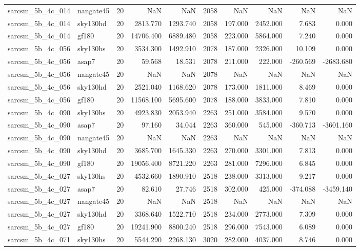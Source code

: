 \begin{longtable}{llrrrrrrrr}
sarcsm\_5b\_4c\_014 & nangate45 & 20 & NaN & NaN & 2058 & NaN & NaN & NaN & NaN \\
sarcsm\_5b\_4c\_014 & sky130hd & 20 & 2813.770 & 1293.740 & 2058 & 197.000 & 2452.000 & 7.683 & 0.000 \\
sarcsm\_5b\_4c\_014 & gf180 & 20 & 14706.400 & 6889.480 & 2058 & 223.000 & 5864.000 & 7.240 & 0.000 \\
sarcsm\_5b\_4c\_056 & sky130hs & 20 & 3534.300 & 1492.910 & 2078 & 187.000 & 2326.000 & 10.109 & 0.000 \\
sarcsm\_5b\_4c\_056 & asap7 & 20 & 59.568 & 18.531 & 2078 & 211.000 & 222.000 & -260.569 & -2683.680 \\
sarcsm\_5b\_4c\_056 & nangate45 & 20 & NaN & NaN & 2078 & NaN & NaN & NaN & NaN \\
sarcsm\_5b\_4c\_056 & sky130hd & 20 & 2521.040 & 1168.620 & 2078 & 173.000 & 1811.000 & 8.469 & 0.000 \\
sarcsm\_5b\_4c\_056 & gf180 & 20 & 11568.100 & 5695.600 & 2078 & 188.000 & 3833.000 & 7.810 & 0.000 \\
sarcsm\_5b\_4c\_090 & sky130hs & 20 & 4923.830 & 2053.940 & 2263 & 251.000 & 3584.000 & 9.570 & 0.000 \\
sarcsm\_5b\_4c\_090 & asap7 & 20 & 97.160 & 34.044 & 2263 & 360.000 & 545.000 & -360.713 & -3601.160 \\
sarcsm\_5b\_4c\_090 & nangate45 & 20 & NaN & NaN & 2263 & NaN & NaN & NaN & NaN \\
sarcsm\_5b\_4c\_090 & sky130hd & 20 & 3685.700 & 1645.330 & 2263 & 270.000 & 3301.000 & 7.813 & 0.000 \\
sarcsm\_5b\_4c\_090 & gf180 & 20 & 19056.400 & 8721.220 & 2263 & 281.000 & 7296.000 & 6.845 & 0.000 \\
sarcsm\_5b\_4c\_027 & sky130hs & 20 & 4532.660 & 1890.910 & 2518 & 238.000 & 3313.000 & 9.217 & 0.000 \\
sarcsm\_5b\_4c\_027 & asap7 & 20 & 82.610 & 27.746 & 2518 & 302.000 & 425.000 & -374.088 & -3459.140 \\
sarcsm\_5b\_4c\_027 & nangate45 & 20 & NaN & NaN & 2518 & NaN & NaN & NaN & NaN \\
sarcsm\_5b\_4c\_027 & sky130hd & 20 & 3368.640 & 1522.710 & 2518 & 234.000 & 2773.000 & 7.309 & 0.000 \\
sarcsm\_5b\_4c\_027 & gf180 & 20 & 19241.900 & 8800.240 & 2518 & 296.000 & 7543.000 & 6.089 & 0.000 \\
sarcsm\_5b\_4c\_071 & sky130hs & 20 & 5544.290 & 2268.130 & 3020 & 282.000 & 4037.000 & 8.746 & 0.000 \\

\end{longtable}
